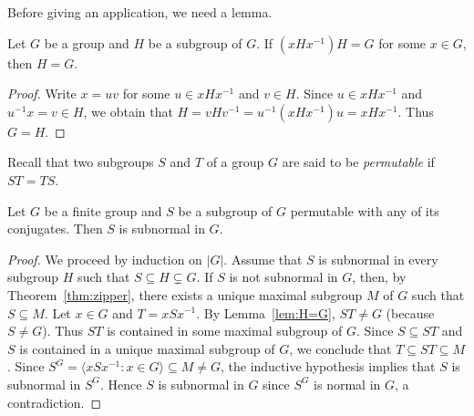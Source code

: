 Before giving an application, we need a lemma. 

\begin{lemma}
	\label{lem:H=G}
	Let $G$ be a group and $H$ be a subgroup of $G$. If $(xHx^{-1})H=G$ for some 
	$x\in G$, then $H=G$.
\end{lemma}

\begin{proof}
	Write $x=uv$ for some $u\in xHx^{-1}$ and $v\in H$. Since $u\in xHx^{-1}$ and
	$u^{-1}x=v\in H$, we obtain that $H=vHv^{-1}=u^{-1}(xHx^{-1})u=xHx^{-1}$. Thus
	$G=H$. 
\end{proof}

Recall that two subgroups $S$ and $T$ of a group $G$ are said to be
\emph{permutable} if $ST=TS$. 

\begin{theorem}
	Let $G$ be a finite group and $S$ be a subgroup of $G$ permutable with any of
	its conjugates. Then $S$ is subnormal in $G$. 
\end{theorem}

\begin{proof}
	We proceed by induction on $|G|$. Assume that $S$ is subnormal in 
	every subgroup $H$ such that $S\subseteq H\subsetneq G$.  If $S$ is not subnormal in $G$, 
	then, by Theorem~\ref{thm:zipper}, there exists a unique maximal subgroup $M$ of $G$ 
	such that $S\subseteq M$. Let $x\in G$ and 
	$T=xSx^{-1}$. By Lemma~\ref{lem:H=G}, $ST\ne G$ (because $S\ne G$). Thus 
	$ST$ is contained in some maximal subgroup of $G$. Since 
	$S\subseteq ST$ and $S$ is contained in a unique maximal subgroup of $G$, we conclude that 
	$T\subseteq ST\subseteq M$.  Since $S^G=\langle xSx^{-1}:x\in
	G\rangle\subseteq M\ne G$, the inductive hypothesis implies that $S$ is subnormal in
	$S^G$. Hence $S$ is subnormal in $G$ since $S^G$ is normal in $G$, a contradiction. 
\end{proof}

